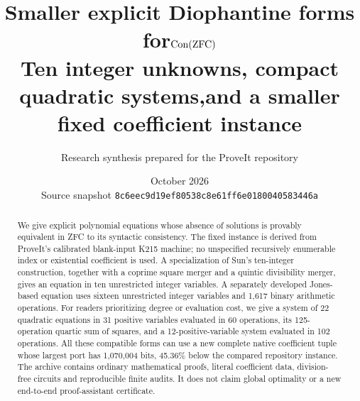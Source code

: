 \documentclass[11pt,a4paper]{article}
\title{Smaller explicit Diophantine forms for\newline $\operatorname{Con}(\mathrm{ZFC})$\\[6pt]
\large Ten integer unknowns, compact quadratic systems,\newline and a smaller fixed coefficient instance}
\author{Research synthesis prepared for the ProveIt repository}
\date{October 2026\\\small Source snapshot \texttt{8c6eec9d19ef80538c8e61ff6e0180040583446a}}
\numberwithin{equation}{section}
\theoremstyle{definition}
\begin{document}
\maketitle
\begin{abstract}
We give explicit polynomial equations whose absence of solutions is
provably equivalent in ZFC to its syntactic consistency.  The fixed
instance is derived from ProveIt's calibrated blank-input K215 machine;
no unspecified recursively enumerable index or existential coefficient
is used.  A specialization of Sun's ten-integer construction, together
with a coprime square merger and a quintic divisibility merger, gives an
equation in ten unrestricted integer variables.  A separately developed
Jones-based equation uses sixteen unrestricted integer variables and
1,617 binary arithmetic operations.  For readers prioritizing degree or
evaluation cost, we give a system of 22 quadratic equations in 31 positive
variables evaluated in 60 operations, its 125-operation quartic sum of
squares, and a 12-positive-variable system evaluated in 102 operations.
All these compatible forms can use a new complete native coefficient
tuple whose largest port has 1,070,004 bits, 45.36\% below the compared
repository instance.  The archive contains ordinary mathematical proofs,
literal coefficient data, division-free circuits and reproducible finite
audits.  It does not claim global optimality or a new end-to-end
proof-assistant certificate.
\end{abstract}
\tableofcontents
\clearpage








\end{document}
